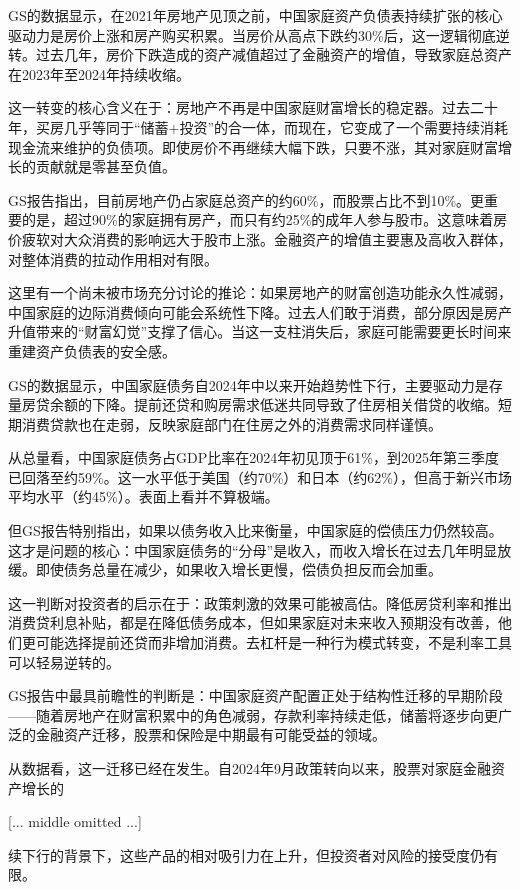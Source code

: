 \documentclass[11pt]{ctexart}
\begin{document}
GS的数据显示，在2021年房地产见顶之前，中国家庭资产负债表持续扩张的核心驱动力是房价上涨和房产购买积累。当房价从高点下跌约30\%后，这一逻辑彻底逆转。过去几年，房价下跌造成的资产减值超过了金融资产的增值，导致家庭总资产在2023年至2024年持续收缩。

这一转变的核心含义在于：房地产不再是中国家庭财富增长的稳定器。过去二十年，买房几乎等同于“储蓄+投资”的合一体，而现在，它变成了一个需要持续消耗现金流来维护的负债项。即使房价不再继续大幅下跌，只要不涨，其对家庭财富增长的贡献就是零甚至负值。

GS报告指出，目前房地产仍占家庭总资产的约60\%，而股票占比不到10\%。更重要的是，超过90\%的家庭拥有房产，而只有约25\%的成年人参与股市。这意味着房价疲软对大众消费的影响远大于股市上涨。金融资产的增值主要惠及高收入群体，对整体消费的拉动作用相对有限。

这里有一个尚未被市场充分讨论的推论：如果房地产的财富创造功能永久性减弱，中国家庭的边际消费倾向可能会系统性下降。过去人们敢于消费，部分原因是房产升值带来的“财富幻觉”支撑了信心。当这一支柱消失后，家庭可能需要更长时间来重建资产负债表的安全感。

GS的数据显示，中国家庭债务自2024年中以来开始趋势性下行，主要驱动力是存量房贷余额的下降。提前还贷和购房需求低迷共同导致了住房相关借贷的收缩。短期消费贷款也在走弱，反映家庭部门在住房之外的消费需求同样谨慎。

从总量看，中国家庭债务占GDP比率在2024年初见顶于61\%，到2025年第三季度已回落至约59\%。这一水平低于美国（约70\%）和日本（约62\%），但高于新兴市场平均水平（约45\%）。表面上看并不算极端。

但GS报告特别指出，如果以债务收入比来衡量，中国家庭的偿债压力仍然较高。这才是问题的核心：中国家庭债务的“分母”是收入，而收入增长在过去几年明显放缓。即使债务总量在减少，如果收入增长更慢，偿债负担反而会加重。

这一判断对投资者的启示在于：政策刺激的效果可能被高估。降低房贷利率和推出消费贷利息补贴，都是在降低债务成本，但如果家庭对未来收入预期没有改善，他们更可能选择提前还贷而非增加消费。去杠杆是一种行为模式转变，不是利率工具可以轻易逆转的。

GS报告中最具前瞻性的判断是：中国家庭资产配置正处于结构性迁移的早期阶段——随着房地产在财富积累中的角色减弱，存款利率持续走低，储蓄将逐步向更广泛的金融资产迁移，股票和保险是中期最有可能受益的领域。

从数据看，这一迁移已经在发生。自2024年9月政策转向以来，股票对家庭金融资产增长的

[... middle omitted ...]

续下行的背景下，这些产品的相对吸引力在上升，但投资者对风险的接受度仍有限。
\end{document}
